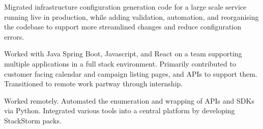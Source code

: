 \documentclass[9pt,letter]{altacv}
\begin{document}

\begin{fullwidth}
\marginpar{\makesidebarheader}
    \vspace*{-1\baselineskip}
\makecvheader
\end{fullwidth}
\vspace{.65\baselineskip}


Migrated infrastructure configuration generation code for a large scale service running live in production, while adding validation, automation, and reorganising the codebase to support more streamlined changes and reduce configuration errors.

\divider

Worked with Java Spring Boot, Javascript, and React on a team supporting multiple applications in a full stack environment. Primarily contributed to customer facing calendar and campaign listing pages, and APIs to support them. Transitioned to remote work partway through internship.

\divider

Worked remotely.
Automated the enumeration and wrapping of APIs and SDKs via Python.
Integrated various tools into a central platform by developing StackStorm packs.
\end{document}
